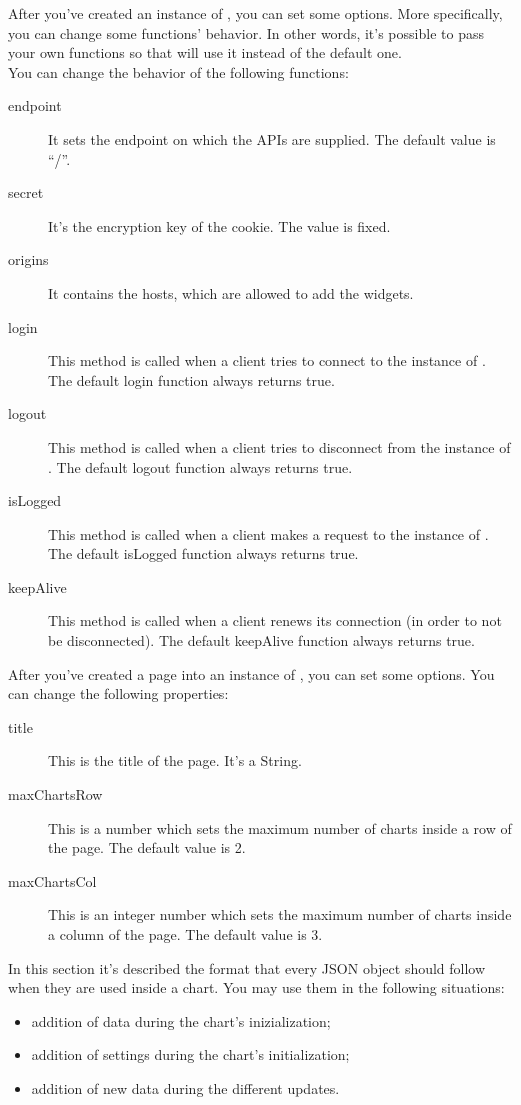  \label{sec:ObjectsDescription}
	 \label{sec:ObjectsDescriptionNorris}
		After you've created an instance of , you can set some options. More specifically, you can change some functions' behavior. In other words, it's possible to pass your own functions so that  will use it instead of the default one.\\
		You can change the behavior of the following functions:
		\begin{description}
			\item[endpoint] It sets the endpoint on which the APIs are supplied. The default value is “/”.
			\item[secret] It's the encryption key of the cookie. The value is fixed.
			\item[origins] It contains the hosts, which are allowed to add the widgets.
			\item[login] This method is called when a client tries to connect to the instance of . The default login function always returns true.
			\item[logout] This method is called when a client tries to disconnect from the instance of . The default logout function always returns true.
			\item[isLogged] This method is called when a client makes a request to the instance of . The default isLogged function always returns true.
			\item[keepAlive] This method is called when a client renews its connection (in order to not be disconnected). The default keepAlive function always returns true.
		\end{description}
		After you've created a page into an instance of , you can set some options. You can change the following properties:
		\begin{description}
			\item[title] This is the title of the page. It's a String.
			\item[maxChartsRow] This is a number which sets the maximum number of charts inside a row of the page. The default value is 2.
			\item[maxChartsCol] This is an integer number which sets the maximum number of charts inside a column of the page. The default value is 3.
		\end{description}
	 \label{sec:ObjectsDescriptionCharts}
		In this section it's described the format that every JSON object should follow when they are used inside a chart. You may use them in the following situations:
		\begin{itemize}
			\item addition of data during the chart's inizialization;
			\item addition of settings during the chart's initialization;
			\item addition of new data during the different updates.
		\end{itemize}

